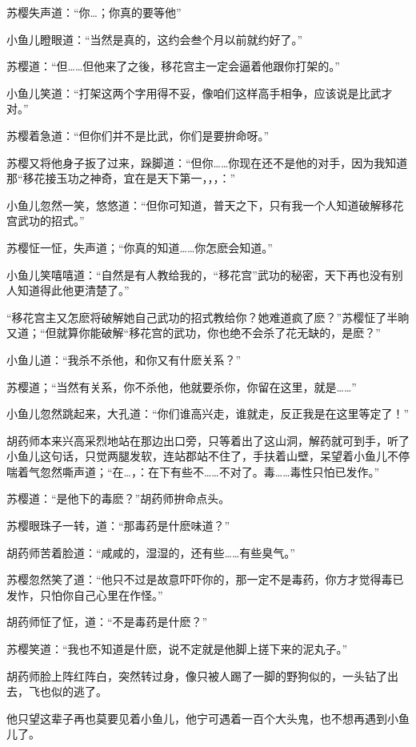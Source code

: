 \documentclass[12pt,oneside]{book}
\begin{document}
苏樱失声道：``你\ldots；你真的要等他''

小鱼儿瞪眼道：``当然是真的，这约会叁个月以前就约好了。''

苏樱道：``但\ldots\ldots 但他来了之後，移花宫主一定会逼着他跟你打架的。''

小鱼儿笑道：``打架这两个字用得不妥，像咱们这样高手相争，应该说是比武才对。''

苏樱着急道：``但你们并不是比武，你们是要拚命呀。''

苏樱又将他身子扳了过来，跺脚道：``但你\ldots\ldots 你现在还不是他的对手，因为我知道那``移花接玉功之神奇，宜在是天下第一，，，：''

小鱼儿忽然一笑，悠悠道：``但你可知道，普天之下，只有我一个人知道破解移花宫武功的招式。''

苏樱怔一怔，失声道；``你真的知道\ldots\ldots 你怎麽会知道。''

小鱼儿笑嘻嘻道：``自然是有人教给我的，``移花宫''武功的秘密，天下再也没有别人知道得此他更清楚了。''

``移花宫主又怎麽将破解她自己武功的招式教给你？她难道疯了麽？''苏樱怔了半晌又道；``但就算你能破解``移花宫的武功，你也绝不会杀了花无缺的，是麽？''

小鱼儿道：``我杀不杀他，和你又有什麽关系？''

苏樱道；``当然有关系，你不杀他，他就要杀你，你留在这里，就是\ldots\ldots{}''

小鱼儿忽然跳起来，大孔道：``你们谁高兴走，谁就走，反正我是在这里等定了！''

胡药师本来兴高采烈地站在那边出口旁，只等着出了这山洞，解药就可到手，听了小鱼儿这句话，只觉两腿发软，连站郡站不住了，手扶着山壁，呆望着小鱼儿不停喘着气忽然嘶声道；``在\ldots，：在下有些不\ldots\ldots 不对了。毒\ldots\ldots 毒性只怕已发作。''

苏樱道：``是他下的毒麽？''胡药师拚命点头。

苏樱眼珠子一转，道：``那毒药是什麽味道？''

胡药师苦着脸道：``咸咸的，湿湿的，还有些\ldots\ldots 有些臭气。''

苏樱忽然笑了道：``他只不过是故意吓吓你的，那一定不是毒药，你方才觉得毒已发怍，只怕你自己心里在作怪。''

胡药师怔了怔，道：``不是毒药是什麽？''

苏樱笑道：``我也不知道是什麽，说不定就是他脚上搓下来的泥丸子。''

胡药师脸上阵红阵白，突然转过身，像只被人踢了一脚的野狗似的，一头钻了出去，飞也似的逃了。

他只望这辈子再也莫要见着小鱼儿，他宁可遇着一百个大头鬼，也不想再遇到小鱼儿了。
\end{document}
